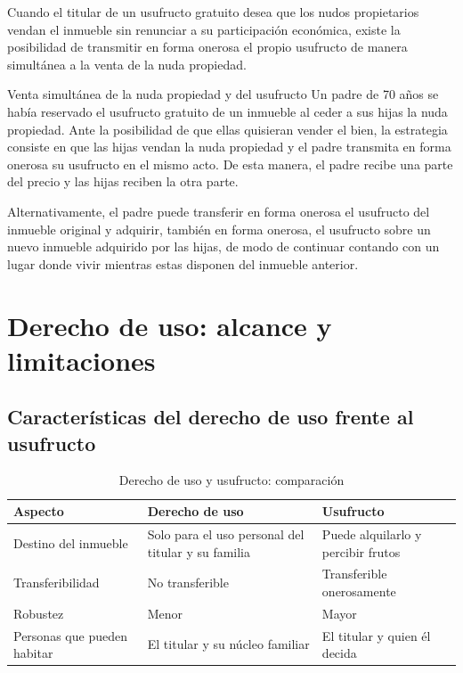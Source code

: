 \documentclass[12pt,oneside]{book}
\begin{document}
Cuando el titular de un usufructo gratuito desea que los nudos propietarios vendan el inmueble sin renunciar a su participación económica, existe la posibilidad de transmitir en forma onerosa el propio usufructo de manera simultánea a la venta de la nuda propiedad.

\begin{example}{Venta simultánea de la nuda propiedad y del usufructo}
Un padre de 70 años se había reservado el usufructo gratuito de un inmueble al ceder a sus hijas la nuda propiedad. Ante la posibilidad de que ellas quisieran vender el bien, la estrategia consiste en que las hijas vendan la nuda propiedad y el padre transmita en forma onerosa su usufructo en el mismo acto. De esta manera, el padre recibe una parte del precio y las hijas reciben la otra parte.

Alternativamente, el padre puede transferir en forma onerosa el usufructo del inmueble original y adquirir, también en forma onerosa, el usufructo sobre un nuevo inmueble adquirido por las hijas, de modo de continuar contando con un lugar donde vivir mientras estas disponen del inmueble anterior.
\end{example}

\section{Derecho de uso: alcance y limitaciones}

\subsection{Características del derecho de uso frente al usufructo}

\begin{table}[H]
\centering
\caption{Derecho de uso y usufructo: comparación}
\begin{tabularx}{\textwidth}{>{\raggedright\arraybackslash}X >{\raggedright\arraybackslash}X >{\raggedright\arraybackslash}X}
\toprule
\textbf{Aspecto} & \textbf{Derecho de uso} & \textbf{Usufructo} \\
\midrule
Destino del inmueble & Solo para el uso personal del titular y su familia & Puede alquilarlo y percibir frutos \\
Transferibilidad & No transferible & Transferible onerosamente \\
Robustez & Menor & Mayor \\
Personas que pueden habitar & El titular y su núcleo familiar & El titular y quien él decida \\
\bottomrule
\end{tabularx}
\end{table}
\end{document}
